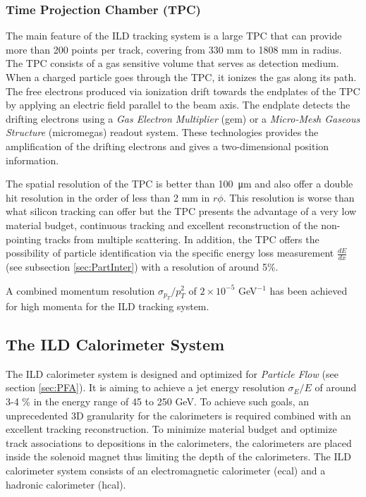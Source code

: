 \subsubsection{Time Projection Chamber (TPC)}

The main feature of the ILD tracking system is a large TPC that can provide more than 200 points per track, covering from 330 mm to 1808 mm in radius. The TPC consists of a gas sensitive volume that serves as detection medium. When a charged particle goes through the TPC, it ionizes the gas along its path. The free electrons produced via ionization drift towards the endplates of the TPC by applying an electric field parallel to the beam axis. The endplate detects the drifting electrons using a \textit{Gas Electron Multiplier} (\acrshort{gem}) \cite{Sauli:1997qp} or a \textit{Micro-Mesh Gaseous Structure} (\acrshort{micromegas}) \cite{Giomataris:1995fq} readout system. These technologies provides the amplification of the drifting electrons and gives a two-dimensional position information.

The spatial resolution of the TPC is better than \SI{100}{\micro\meter} \cite{Mueller:301339} and also offer a double hit resolution in the order of less than 2 mm in $r\phi$. This resolution is worse than what silicon tracking can offer but the TPC presents the advantage of a very low material budget, continuous tracking and excellent reconstruction of the non-pointing tracks from multiple scattering. In addition, the TPC offers the possibility of particle identification via the specific energy loss measurement $\frac{dE}{dx}$ (see subsection \ref{sec:PartInter}) with a resolution of around 5\%.

A combined momentum resolution $\sigma_{p_T}/p_T^2$ of $2 \times 10^{-5}$ GeV$^{-1}$ has been achieved for high momenta for the ILD tracking system.

\subsection{The ILD Calorimeter System}

The ILD calorimeter system is designed and optimized for \textit{Particle Flow} (see section \ref{sec:PFA}). It is aiming to achieve a jet energy resolution $\sigma_E/E$ of around 3-4 \% in the energy range of 45 to 250 GeV. To achieve such goals, an unprecedented 3D granularity for the calorimeters is required combined with an excellent tracking reconstruction. To minimize material budget and optimize track associations to depositions in the calorimeters, the calorimeters are placed inside the solenoid magnet thus limiting the depth of the calorimeters. The ILD calorimeter system consists of an electromagnetic calorimeter (\acrshort{ecal}) and a hadronic calorimeter (\acrshort{hcal}).

